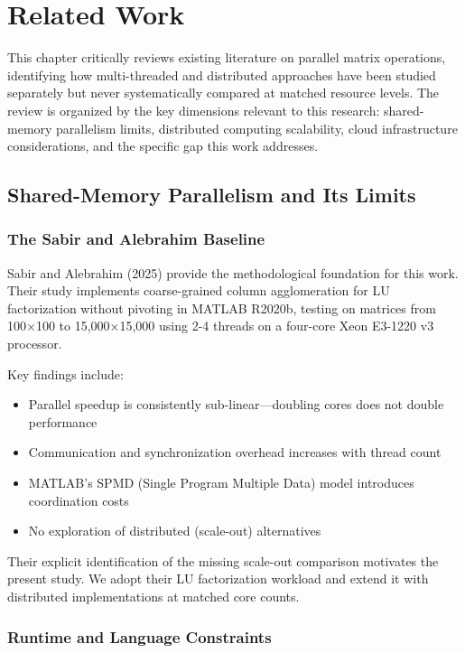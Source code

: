 \chapter{Related Work}

This chapter critically reviews existing literature on parallel matrix operations, identifying how multi-threaded and distributed approaches have been studied separately but never systematically compared at matched resource levels. The review is organized by the key dimensions relevant to this research: shared-memory parallelism limits, distributed computing scalability, cloud infrastructure considerations, and the specific gap this work addresses.

\section{Shared-Memory Parallelism and Its Limits}

\subsection{The Sabir and Alebrahim Baseline}

Sabir and Alebrahim (2025) \cite{sabir2025coarse} provide the methodological foundation for this work. Their study implements coarse-grained column agglomeration for LU factorization without pivoting in MATLAB R2020b, testing on matrices from 100×100 to 15,000×15,000 using 2-4 threads on a four-core Xeon E3-1220 v3 processor. 

Key findings include:
\begin{itemize}
    \item Parallel speedup is consistently sub-linear—doubling cores does not double performance
    \item Communication and synchronization overhead increases with thread count
    \item MATLAB's SPMD (Single Program Multiple Data) model introduces coordination costs
    \item No exploration of distributed (scale-out) alternatives
\end{itemize}

Their explicit identification of the missing scale-out comparison motivates the present study. We adopt their LU factorization workload and extend it with distributed implementations at matched core counts.

\subsection{Runtime and Language Constraints}

